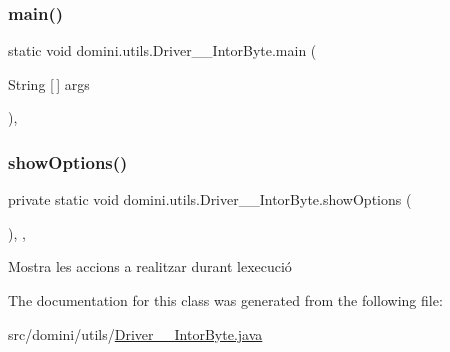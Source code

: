 \subsubsection{\texorpdfstring{main()}{main()}}
{\footnotesize\ttfamily static void domini.\+utils.\+Driver\+\_\+\+\_\+\+Intor\+Byte.\+main (\begin{DoxyParamCaption}\item[{String \mbox{[}$\,$\mbox{]}}]{args }\end{DoxyParamCaption})\hspace{0.3cm}{\ttfamily [inline]}, {\ttfamily [static]}}

\mbox{\label{classdomini_1_1utils_1_1Driver____IntorByte_a4b647dae1760fc058de9a7311595d8dd}} 
\subsubsection{\texorpdfstring{show\+Options()}{showOptions()}}
{\footnotesize\ttfamily private static void domini.\+utils.\+Driver\+\_\+\+\_\+\+Intor\+Byte.\+show\+Options (\begin{DoxyParamCaption}{ }\end{DoxyParamCaption})\hspace{0.3cm}{\ttfamily [inline]}, {\ttfamily [static]}, {\ttfamily [private]}}



Mostra les accions a realitzar durant l\textquotesingle{}execució 



The documentation for this class was generated from the following file\+:\begin{DoxyCompactItemize}
\item 
src/domini/utils/\hyperlink{Driver____IntorByte_8java}{Driver\+\_\+\+\_\+\+Intor\+Byte.\+java}\end{DoxyCompactItemize}
